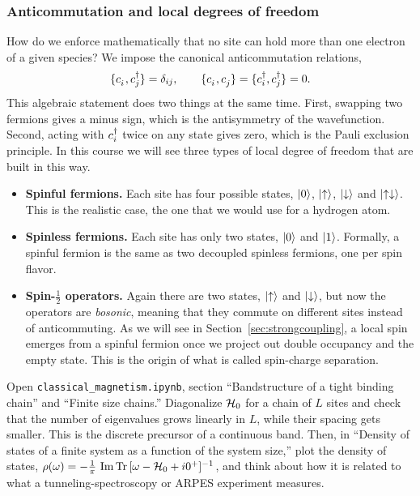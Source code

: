 \documentclass[lecture_notes.tex]{subfiles}
\begin{document}
\subsubsection{Anticommutation and local degrees of freedom}
How do we enforce mathematically that no site can hold more than one electron of a given
species? We impose the canonical anticommutation relations,
\begin{equation}
  \{\ann{i},\cre{j}\} = \delta_{ij}, \qquad \{\ann{i},\ann{j}\} = \{\cre{i},\cre{j}\} = 0.
  \label{eq:anticomm}
\end{equation}
This algebraic statement does two things at the same time. First, swapping two fermions gives a
minus sign, which is the antisymmetry of the wavefunction. Second, acting with $c^{\dagger}_{i}$ twice
on any state gives zero, which is the Pauli exclusion principle. In this course we will see three
types of local degree of freedom that are built in this way.
\begin{itemize}[nosep]
  \item \textbf{Spinful fermions.} Each site has four possible states, $\ket{0}$, $\ket{\uparrow}$,
    $\ket{\downarrow}$ and $\ket{\uparrow\downarrow}$. This is the realistic case, the one that we would use for a
    hydrogen atom.
  \item \textbf{Spinless fermions.} Each site has only two states, $\ket{0}$ and $\ket{1}$.
    Formally, a spinful fermion is the same as two decoupled spinless fermions, one per spin
    flavor.
  \item \textbf{Spin-$\tfrac12$ operators.} Again there are two states, $\ket{\uparrow}$ and
    $\ket{\downarrow}$, but now the operators are \emph{bosonic}, meaning that they commute on different
    sites instead of anticommuting. As we will see in Section~\ref{sec:strongcoupling}, a local
    spin emerges from a spinful fermion once we project out double occupancy and the empty
    state. This is the origin of what is called spin-charge separation.
\end{itemize}

\begin{notebook}
Open \texttt{classical\_magnetism.ipynb}, section ``Bandstructure of a tight binding chain'' and
``Finite size chains.'' Diagonalize $\mathcal{H}_0$ for a chain of $L$ sites and check that the number
of eigenvalues grows linearly in $L$, while their spacing gets smaller. This is the discrete
precursor of a continuous band. Then, in ``Density of states of a finite system as a
function of the system size,'' plot the density of states, $\rho(\omega) =
-\tfrac1\pi\,\Im\Tr\,[\omega - \mathcal{H}_0 + i0^+]^{-1}$, and think about how it is related to what a
tunneling-spectroscopy or ARPES experiment measures.
\end{notebook}
\end{document}
